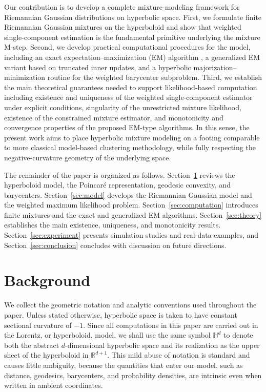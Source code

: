 \documentclass[11pt]{article}
\begin{document}
Our contribution is to develop a complete mixture-modeling framework for Riemannian Gaussian distributions on hyperbolic space. First, we formulate finite Riemannian Gaussian mixtures on the hyperboloid and show that weighted single-component estimation is the fundamental primitive underlying the mixture M-step. Second, we develop practical computational procedures for the model, including an exact expectation--maximization (EM) algorithm \citep{dempster_1977_MaximumLikelihoodIncomplete}, a generalized EM variant based on truncated inner updates, and a hyperbolic majorization--minimization routine for the weighted barycenter subproblem. Third, we establish the main theoretical guarantees needed to support likelihood-based computation including existence and uniqueness of the weighted single-component estimator under explicit conditions, singularity of the unrestricted mixture likelihood, existence of the constrained mixture estimator, and monotonicity and convergence properties of the proposed EM-type algorithms. In this sense, the present work aims to place hyperbolic mixture modeling on a footing comparable to more classical model-based clustering methodology, while fully respecting the negative-curvature geometry of the underlying space.

The remainder of the paper is organized as follows. 
Section~\ref{sec:background} reviews the hyperboloid model, the Poincar\'e representation, geodesic convexity, and barycenters. 
Section~\ref{sec:model} develops the Riemannian Gaussian model and the weighted maximum likelihood problem. 
Section~\ref{sec:computation} introduces finite mixtures and the exact and generalized EM algorithms. 
Section~\ref{sec:theory} establishes the main existence, uniqueness, and monotonicity results. 
Section~\ref{sec:experiment} presents simulation studies and real-data examples, and Section~\ref{sec:conclusion} concludes with discussion on future directions. 


\section{Background}\label{sec:background}


We collect the geometric notation and analytic conventions used throughout the paper. Unless stated otherwise, hyperbolic space is taken to have constant sectional curvature of $-1$. Since all computations in this paper are carried out in the Lorentz, or hyperboloid, model, we shall use the same symbol \(\mathbb{H}^d\) to denote both the abstract \(d\)-dimensional hyperbolic space and its realization as the upper sheet of the hyperboloid in \(\mathbb{R}^{d+1}\). This mild abuse of notation is standard and causes little ambiguity, because the quantities that enter our model, such as distance, geodesics, barycenters, and probability densities, are intrinsic even when written in ambient coordinates.
\end{document}
